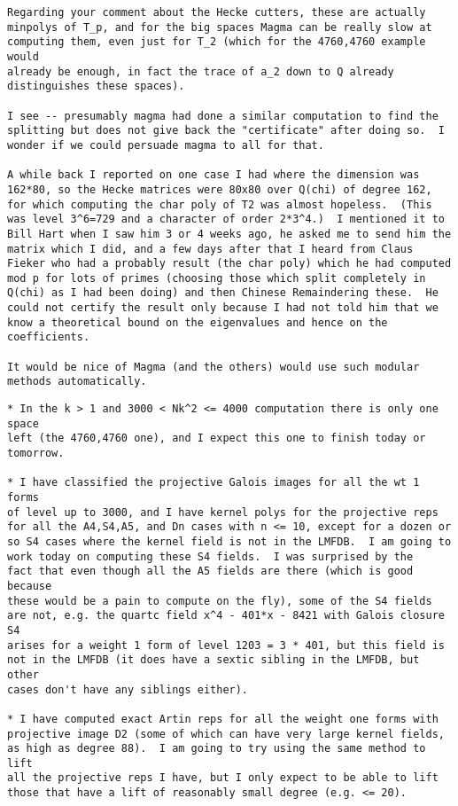 \documentclass[11pt]{amsart}
\numberwithin{equation}{subsection}
\theoremstyle{definition}
\begin{document}
\begin{verbatim}
Regarding your comment about the Hecke cutters, these are actually 
minpolys of T_p, and for the big spaces Magma can be really slow at 
computing them, even just for T_2 (which for the 4760,4760 example would 
already be enough, in fact the trace of a_2 down to Q already 
distinguishes these spaces).

I see -- presumably magma had done a similar computation to find the splitting but does not give back the "certificate" after doing so.  I wonder if we could persuade magma to all for that.

A while back I reported on one case I had where the dimension was 162*80, so the Hecke matrices were 80x80 over Q(chi) of degree 162, for which computing the char poly of T2 was almost hopeless.  (This was level 3^6=729 and a character of order 2*3^4.)  I mentioned it to Bill Hart when I saw him 3 or 4 weeks ago, he asked me to send him the matrix which I did, and a few days after that I heard from Claus Fieker who had a probably result (the char poly) which he had computed mod p for lots of primes (choosing those which split completely in Q(chi) as I had been doing) and then Chinese Remaindering these.  He could not certify the result only because I had not told him that we know a theoretical bound on the eigenvalues and hence on the coefficients.

It would be nice of Magma (and the others) would use such modular methods automatically.
\end{verbatim}

\begin{verbatim}
* In the k > 1 and 3000 < Nk^2 <= 4000 computation there is only one 
space
left (the 4760,4760 one), and I expect this one to finish today or 
tomorrow.

* I have classified the projective Galois images for all the wt 1 forms
of level up to 3000, and I have kernel polys for the projective reps
for all the A4,S4,A5, and Dn cases with n <= 10, except for a dozen or
so S4 cases where the kernel field is not in the LMFDB.  I am going to
work today on computing these S4 fields.  I was surprised by the
fact that even though all the A5 fields are there (which is good because
these would be a pain to compute on the fly), some of the S4 fields
are not, e.g. the quartc field x^4 - 401*x - 8421 with Galois closure S4
arises for a weight 1 form of level 1203 = 3 * 401, but this field is
not in the LMFDB (it does have a sextic sibling in the LMFDB, but other
cases don't have any siblings either).

* I have computed exact Artin reps for all the weight one forms with
projective image D2 (some of which can have very large kernel fields,
as high as degree 88).  I am going to try using the same method to lift
all the projective reps I have, but I only expect to be able to lift
those that have a lift of reasonably small degree (e.g. <= 20).
\end{verbatim}
\end{document}
